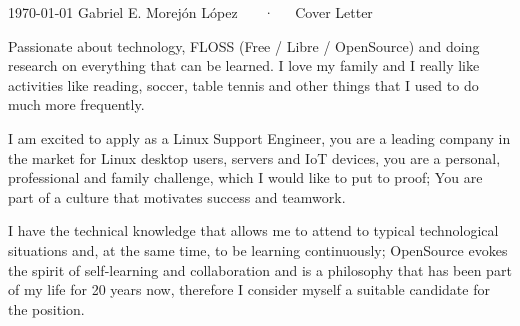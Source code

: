 \documentclass[11pt, a4paper]{awesome-cv}
\begin{document}
\makecvheader[R]

\makecvfooter
  {\today}
  {Gabriel E. Morejón López ~~~·~~~Cover Letter}
  {}

\makelettertitle

\begin{cvletter}

Passionate about technology, FLOSS (Free / Libre / OpenSource) and doing research on everything that can be learned. I love my family and I really like activities like reading, soccer, table tennis and other things that I used to do much more frequently. 

I am excited to apply as a Linux Support Engineer, you are a leading company in the market for Linux desktop users, servers and IoT devices, you are a personal, professional and family challenge, which I would like to put to proof; You are part of a culture that motivates success and teamwork.

I have the technical knowledge that allows me to attend to typical technological situations and, at the same time, to be learning continuously; OpenSource evokes the spirit of self-learning and collaboration and is a philosophy that has been part of my life for 20 years now, therefore I consider myself a suitable candidate for the position. 

\end{cvletter}


\makeletterclosing
\end{document}
